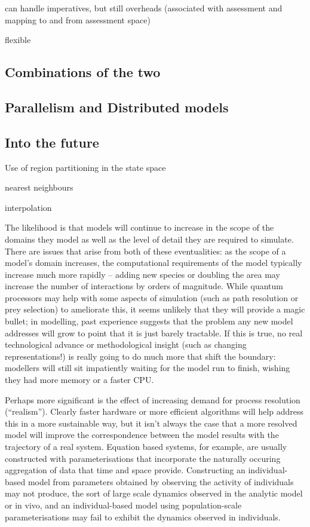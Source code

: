 can handle imperatives, but still overheads (associated with
assessment and mapping to and from assessment space)

flexible


\subsection{Combinations of the two}

\subsection{Parallelism and Distributed models}




\subsection{Into the future}

Use of region partitioning in the state space

nearest neighbours

interpolation






The likelihood is that models will continue to increase in the scope
of the domains they model as well as the level of detail they are
required to simulate.  There are issues that arise from both of these
eventualities: as the scope of a  model's domain increases, the computational
requirements of the model typically increase much more rapidly -- adding new
species or doubling the area may increase the number of interactions
by orders of magnitude. While quantum processors may help with some
aspects of simulation (such as path resolution or prey selection) to 
ameliorate this, it seems unlikely that they will provide a magic
bullet; in modelling, past experience suggests that the problem any new model
addresses will grow to point that it is just barely tractable. If this is
true, no real technological advance or methodological insight (such as
changing representations!) is really going to do much more that shift
the boundary: modellers will still sit impatiently waiting for the
model run to finish, wishing they had more memory or a faster CPU.

Perhaps more significant is the effect of increasing demand for
process resolution (``realism'').  Clearly faster hardware or more
efficient algorithms will help address this in a more sustainable way,
but it isn't always the case that a more resolved model will improve
the correspondence between the model results with the trajectory of a
real system.  Equation based systems, for example, are usually
constructed with parameterisations that incorporate the naturally
occuring aggregation of data that time and space provide.
Constructing an individual-based model from parameters obtained by
observing the activity of individuals may not produce, the sort of
large scale dynamics observed in the analytic model or in vivo, and an
individual-based model using population-scale parameterisations may
fail to exhibit the dynamics observed in individuals.

